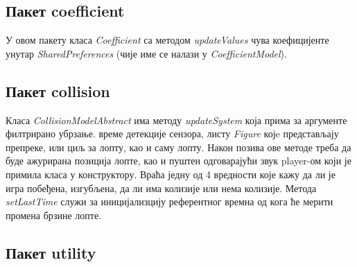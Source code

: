 \subsection{Пакет coefficient}
У овом пакету класа \emph{Coefficient} са методом \emph{updateValues} чува коефицијенте унутар \emph{SharedPreferences} (чије име се налази у \emph{CoefficientModel}). 
\subsection{Пакет collision}
Класа \emph{CollisionModelAbstract} има методу \emph{updateSystem} која прима за аргументе филтрирано убрзање. време детекције сензора, листу  \emph{Figure} којe представљају препреке, или циљ за лопту, као и саму лопту. Након позива ове методе треба да буде ажурирана позиција лопте, као и пуштен одговарајући звук player-ом који је примила класа у конструктору. Враћа једну од 4 вредности које кажу да ли је игра побеђена, изгубљена, да ли има колизије или нема колизије. Метода \emph{setLastTime} служи за иницијализцију референтног времна од кога ће мерити промена брзине лопте.
\subsection{Пакет utility}

